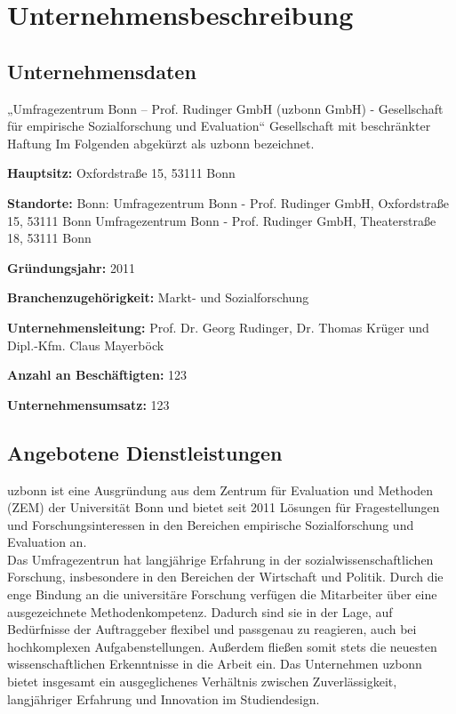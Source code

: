\section{Unternehmensbeschreibung}\label{sec:beschreibung}

\subsection{Unternehmensdaten}
„Umfragezentrum Bonn – Prof. Rudinger GmbH (uzbonn GmbH) - Gesellschaft für empirische Sozialforschung und Evaluation“ \newline
Gesellschaft mit beschränkter Haftung \newline
Im Folgenden abgekürzt als uzbonn bezeichnet. \newline

\textbf{Hauptsitz:} Oxfordstraße 15, 53111 Bonn \newline

\textbf{Standorte:} \newline
Bonn: \newline
Umfragezentrum Bonn - Prof. Rudinger GmbH, Oxfordstraße 15, 53111 Bonn \newline 
Umfragezentrum Bonn - Prof. Rudinger GmbH, Theaterstraße 18, 53111 Bonn \newline

\textbf{Gründungsjahr: } 2011 \newline

\textbf{Branchenzugehörigkeit: }  Markt- und Sozialforschung \newline

\textbf{Unternehmensleitung: } Prof. Dr. Georg Rudinger, Dr. Thomas Krüger und Dipl.-Kfm. Claus Mayerböck \newline


\textbf{Anzahl an Beschäftigten: } 123 \newline

\textbf{Unternehmensumsatz: } 123 \newline


\subsection{Angebotene Dienstleistungen }
uzbonn ist eine Ausgründung aus dem Zentrum für Evaluation und Methoden (ZEM) der Universität Bonn und bietet seit 2011 Lösungen für Fragestellungen und Forschungsinteressen in den Bereichen empirische Sozialforschung und Evaluation an. \\
Das Umfragezentrun hat langjährige Erfahrung in der sozialwissenschaftlichen Forschung, insbesondere in den Bereichen der Wirtschaft und Politik. Durch die enge Bindung an die universitäre Forschung verfügen die Mitarbeiter über eine ausgezeichnete Methodenkompetenz. Dadurch sind sie in der Lage, auf Bedürfnisse der Auftraggeber flexibel und passgenau zu reagieren, auch bei hochkomplexen Aufgabenstellungen. Außerdem fließen somit stets die neuesten wissenschaftlichen Erkenntnisse in die Arbeit ein. Das Unternehmen uzbonn bietet insgesamt ein ausgeglichenes Verhältnis zwischen Zuverlässigkeit, langjähriger Erfahrung und Innovation im Studiendesign.

